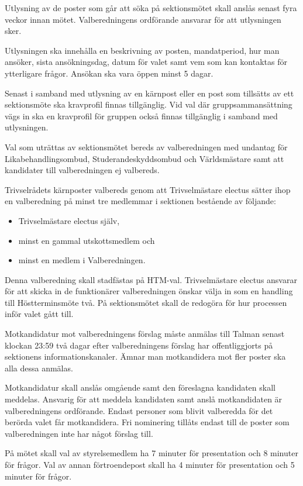 \documentclass{dsekpolicy}
\begin{document}
\begin{parasection}
  Utlysning av de poster som går att söka på sektionsmötet skall anslås senast
  fyra veckor innan mötet. Valberedningens ordförande ansvarar för att utlysningen
  sker.

  Utlysningen ska innehålla en beskrivning av posten, mandatperiod, hur man
  ansöker, sista ansökningsdag, datum för valet samt vem som kan kontaktas för
  ytterligare frågor. Ansökan ska vara öppen minst 5 dagar.

  Senast i samband med utlysning av en kärnpost eller en post som tillsätts av ett
  sektionsmöte ska kravprofil finnas tillgänglig. Vid val där gruppsammansättning
  vägs in ska en kravprofil för gruppen också finnas tillgänglig i samband med
  utlysningen.

  Val som uträttas av sektionsmötet bereds av valberedningen med undantag för
  Likabehandlingsombud, Studerandeskyddsombud och Världsmästare samt att
  kandidater till valberedningen ej valbereds.

  Trivselrådets kärnposter valbereds genom att Trivselmästare electus sätter ihop
  en valberedning på minst tre medlemmar i sektionen bestående av följande:
  \begin{itemize}
    \item Trivselmästare electus själv,
    \item minst en gammal utskottsmedlem och
    \item minst en medlem i Valberedningen.

  \end{itemize}
  Denna valberedning skall stadfästas på HTM-val. Trivselmästare electus
  ansvarar för att skicka in de funktionärer valberedningen önskar välja in som
  en handling till Höstterminsmöte två. På sektionsmötet skall de redogöra för
  hur processen inför valet gått till.

  Motkandidatur mot valberedningens förslag måste anmälas till Talman senast
  klockan 23:59 två dagar efter valberedningens förslag har offentliggjorts på
  sektionens informationskanaler. Ämnar man motkandidera mot fler poster ska alla
  dessa anmälas.

  Motkandidatur skall anslås omgående samt den föreslagna kandidaten skall
  meddelas. Ansvarig för att meddela kandidaten samt anslå motkandidaten är
  valberedningens ordförande. Endast personer som blivit valberedda för det
  berörda valet får motkandidera.  Fri nominering tillåts endast till de poster
  som valberedningen inte har något förslag till.

  På mötet skall val av styrelsemedlem ha 7 minuter för presentation och 8
  minuter för frågor. Val av annan förtroendepost skall ha 4 minuter för
  presentation och 5 minuter för frågor.
\end{parasection}
\end{document}
